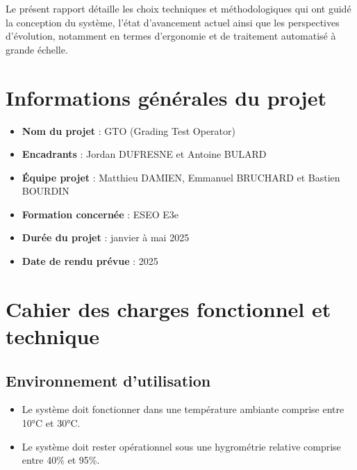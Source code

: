 \documentclass[a4paper,11pt]{article}
\begin{document}
\vspace*{0.5 cm}

Le présent rapport détaille les choix techniques et méthodologiques qui ont guidé la conception du système, l’état d’avancement actuel ainsi que les perspectives d’évolution, notamment en termes d’ergonomie et de traitement automatisé à grande échelle.

\section{Informations générales du projet}
\vspace*{0.5 cm}
\begin{itemize}
    \item \textbf{Nom du projet} : GTO (Grading Test Operator)
    \vspace*{0.5 cm}
    \item \textbf{Encadrants} : Jordan DUFRESNE et Antoine BULARD
    \vspace*{0.5 cm}
    \item \textbf{Équipe projet} : Matthieu DAMIEN, Emmanuel BRUCHARD et Bastien BOURDIN
    \vspace*{0.5 cm}
    \item \textbf{Formation concernée} : ESEO E3e
    \vspace*{0.5 cm}
    \item \textbf{Durée du projet} : janvier à mai 2025
    \vspace*{0.5 cm}
    \item \textbf{Date de rendu prévue} : 2025
\end{itemize}

\newpage
\section{Cahier des charges fonctionnel et technique}

\subsection{Environnement d'utilisation}
\begin{itemize}
    \item Le système doit fonctionner dans une température ambiante comprise entre 10°C et 30°C.
    \item Le système doit rester opérationnel sous une hygrométrie relative comprise entre 40\% et 95\%.
\end{itemize}
\end{document}
